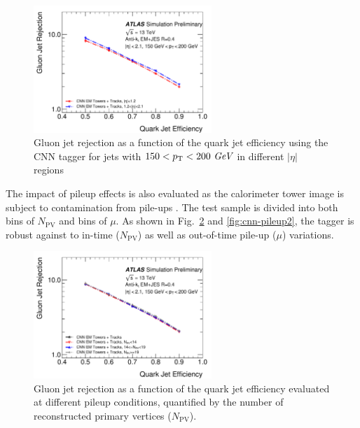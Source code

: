 \begin{figure}[htpb]
\begin{center}
 \includegraphics[width=0.6\textwidth]{figures/CNN/ROC_pt150_200_eta.pdf}
\caption{Gluon jet rejection as a function of the quark jet efficiency using the CNN tagger for jets with $150<p_{{\rm T}}<200~\textit{GeV}$ in different $|\eta|$ regions}
\label{fig:cnn-tracktruth}
\end{center}
\end{figure}

The impact of pileup effects is also evaluated as the calorimeter tower image is subject to contamination from pile-ups
. The test sample is divided into both bins of $N_\text{PV}$
and bins of $\mu$. As shown in Fig.~\ref{fig:cnn-pileup} and \ref{fig:cnn-pileup2}, the tagger is robust against
to in-time ($N_\text{PV}$) as well as out-of-time pile-up ($\mu$) variations.

\begin{figure}[htpb]
\begin{center}
\includegraphics[width=0.6\textwidth]{figures/CNN/ROC_pt150_200_NPV.pdf}
\caption{Gluon jet rejection as a function of the quark jet efficiency %
evaluated at different pileup conditions, 
quantified by the number of reconstructed primary vertices ($N_\text{PV}$).}
\label{fig:cnn-pileup}
\end{center}
\end{figure}

